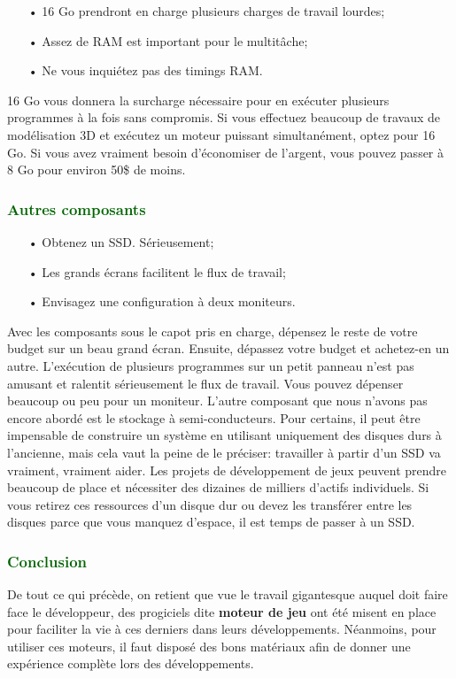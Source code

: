\documentclass[ebook, 8pt, oneside, openany]{memoir}
\begin{document}
	\begin{itemize}
		\item[• 16 Go prendront en charge plusieurs charges de travail lourdes;]
		\item[• Assez de RAM est important pour le multitâche;]
		\item[• Ne vous inquiétez pas des timings RAM.]
	\end{itemize}
	16 Go vous donnera la surcharge nécessaire pour en exécuter plusieurs programmes à la fois sans
	compromis. Si vous effectuez beaucoup de travaux de modélisation 3D et exécutez un moteur puissant
	simultanément, optez pour 16 Go. Si vous avez vraiment besoin d'économiser de l'argent, vous pouvez
	passer à 8 Go pour environ 50\$ de moins.
	\subsubsection{\textcolor{darkgreen}{Autres composants}}
	\begin{itemize}
		\item[• Obtenez un SSD. Sérieusement;]
		\item[• Les grands écrans facilitent le flux de travail;]
		\item[• Envisagez une configuration à deux moniteurs.]
	\end{itemize}
	Avec les composants sous le capot pris en charge, dépensez le reste de votre budget sur un beau grand
	écran. Ensuite, dépassez votre budget et achetez-en un autre. L'exécution de plusieurs programmes sur un
	petit panneau n'est pas amusant et ralentit sérieusement le flux de travail. Vous pouvez dépenser
	beaucoup ou peu pour un moniteur. L'autre composant que nous n'avons pas encore abordé est le stockage à
	semi-conducteurs. Pour certains, il peut être impensable de construire un système en utilisant
	uniquement des disques durs à l'ancienne, mais cela vaut la peine de le préciser: travailler à partir
	d'un SSD va vraiment, vraiment aider. Les projets de développement de jeux peuvent prendre beaucoup de
	place et nécessiter des dizaines de milliers d'actifs individuels. Si vous retirez ces ressources d'un
	disque dur ou devez les transférer entre les disques parce que vous manquez d'espace, il est temps de
	passer à un SSD.
	\subsubsection{\textcolor{darkgreen}{Conclusion}}
	De tout ce qui précède, on retient que vue le travail gigantesque auquel doit faire face le développeur,
	des progiciels dite \textbf{moteur de jeu} ont été misent en place pour faciliter la vie à ces derniers
	dans leurs développements. Néanmoins, pour utiliser ces moteurs, il faut disposé des bons matériaux afin
	de donner une expérience complète lors des développements.
\end{document}
